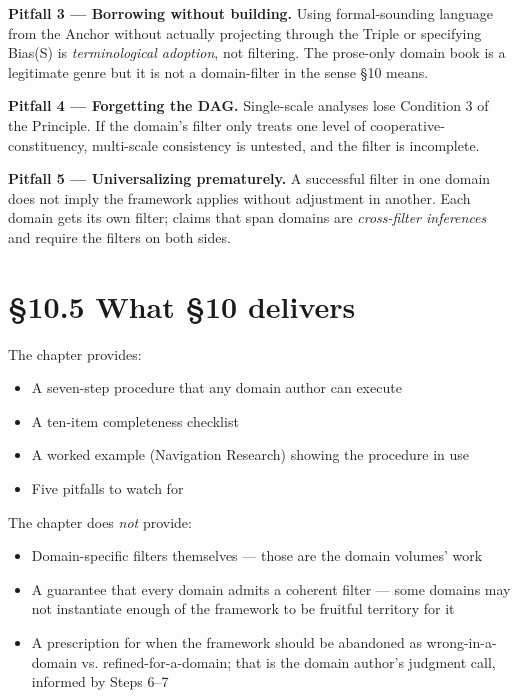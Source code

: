 \documentclass[11pt, openany]{book}
\newcommand{\sectionbreak}{\clearpage}
\begin{document}
\textbf{Pitfall 3 --- Borrowing without building.} Using formal-sounding language from the Anchor without actually projecting through the Triple or specifying Bias(S) is \textit{terminological adoption}, not filtering. The prose-only domain book is a legitimate genre but it is not a domain-filter in the sense §10 means.

\textbf{Pitfall 4 --- Forgetting the DAG.} Single-scale analyses lose Condition 3 of the Principle. If the domain's filter only treats one level of cooperative-constituency, multi-scale consistency is untested, and the filter is incomplete.

\textbf{Pitfall 5 --- Universalizing prematurely.} A successful filter in one domain does not imply the framework applies without adjustment in another. Each domain gets its own filter; claims that span domains are \textit{cross-filter inferences} and require the filters on both sides.

\sectionbreak

\section{§10.5 What §10 delivers}

The chapter provides:

\begin{itemize}
\item A seven-step procedure that any domain author can execute
\item A ten-item completeness checklist
\item A worked example (Navigation Research) showing the procedure in use
\item Five pitfalls to watch for
\end{itemize}

The chapter does \textit{not} provide:

\begin{itemize}
\item Domain-specific filters themselves --- those are the domain volumes' work
\item A guarantee that every domain admits a coherent filter --- some domains may not instantiate enough of the framework to be fruitful territory for it
\item A prescription for when the framework should be abandoned as wrong-in-a-domain vs. refined-for-a-domain; that is the domain author's judgment call, informed by Steps 6–7
\end{itemize}
\end{document}
